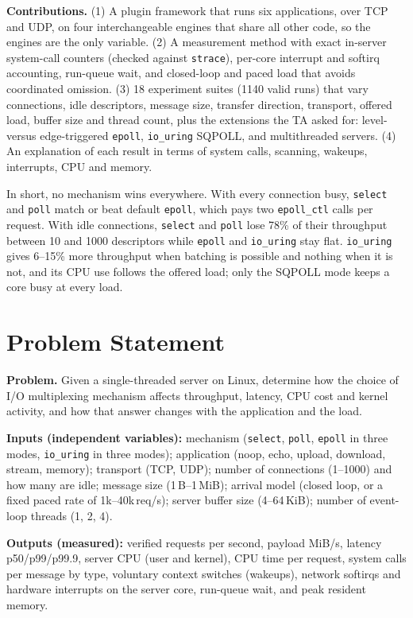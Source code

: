 \documentclass[conference,10pt]{IEEEtran}
\newcommand{\code}[1]{\texttt{#1}}
\begin{document}
\textbf{Contributions.}
(1) A plugin framework that runs six applications, over TCP and UDP, on four interchangeable engines that share all other code, so the engines are the only variable.
(2) A measurement method with exact in-server system-call counters (checked against \code{strace}), per-core interrupt and softirq accounting, run-queue wait, and closed-loop and paced load that avoids coordinated omission.
(3) 18 experiment suites (1140 valid runs) that vary connections, idle descriptors, message size, transfer direction, transport, offered load, buffer size and thread count, plus the extensions the TA asked for: level- versus edge-triggered \code{epoll}, \code{io\_uring} SQPOLL, and multithreaded servers.
(4) An explanation of each result in terms of system calls, scanning, wakeups, interrupts, CPU and memory.

In short, no mechanism wins everywhere. With every connection busy, \code{select} and \code{poll} match or beat default \code{epoll}, which pays two \code{epoll\_ctl} calls per request. With idle connections, \code{select} and \code{poll} lose 78\% of their throughput between 10 and 1000 descriptors while \code{epoll} and \code{io\_uring} stay flat. \code{io\_uring} gives 6--15\% more throughput when batching is possible and nothing when it is not, and its CPU use follows the offered load; only the SQPOLL mode keeps a core busy at every load.

\section{Problem Statement}
\textbf{Problem.} Given a single-threaded server on Linux, determine how the choice of I/O multiplexing mechanism affects throughput, latency, CPU cost and kernel activity, and how that answer changes with the application and the load.

\textbf{Inputs (independent variables):} mechanism (\code{select}, \code{poll}, \code{epoll} in three modes, \code{io\_uring} in three modes); application (noop, echo, upload, download, stream, memory); transport (TCP, UDP); number of connections (1--1000) and how many are idle; message size (1\,B--1\,MiB); arrival model (closed loop, or a fixed paced rate of 1k--40k\,req/s); server buffer size (4--64\,KiB); number of event-loop threads (1, 2, 4).

\textbf{Outputs (measured):} verified requests per second, payload MiB/s, latency p50/p99/p99.9, server CPU (user and kernel), CPU time per request, system calls per message by type, voluntary context switches (wakeups), network softirqs and hardware interrupts on the server core, run-queue wait, and peak resident memory.
\end{document}
